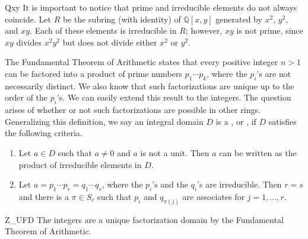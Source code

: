 \begin{example}{Qxy}
It is important to notice that prime and irreducible elements do not
always coincide. Let $R$ be the subring (with identity) of ${\mathbb Q}[x, y]$ generated
by $x^2$, $y^2$, and $xy$.  Each of these elements is irreducible in
$R$; however, $xy$ is not prime, since $xy$ divides $x^2 y^2$ but does
not divide either $x^2$ or $y^2$.
\end{example}


 
 
The Fundamental Theorem of Arithmetic states that every positive
integer $n > 1$ can be factored into a product of prime numbers $p_1
\cdots p_k$, where the $p_i$'s are not necessarily distinct. We also
know that such factorizations are unique up to the order of the
$p_i$'s. We can easily extend this result to the integers. The
question arises of whether or not such factorizations are possible in
other rings.  Generalizing this definition, we say an integral domain
$D$ is a , or , if $D$ satisfies the following criteria.  
\begin{enumerate}
 
\item
Let $a \in D$ such that $a \neq 0$ and $a$ is not a unit.
Then $a$ can be written as the product of irreducible
elements in $D$.
 
\item %
Let $a = p_1 \cdots p_r = q_1 \cdots q_s$, where the $p_i$'s and the
$q_i$'s are irreducible. Then $r=s$ and there is a $\pi \in S_r$ such
that $p_i$ and $q_{\pi(j)}$ are associates for \mbox{$j = 1, \ldots, r$}. 
 
\end{enumerate}


\begin{example}{Z_UFD}
The integers are a unique factorization domain by the Fundamental
Theorem of Arithmetic.
\end{example}
 


